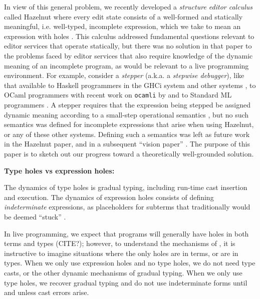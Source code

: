 In view of this general problem, we recently developed a \emph{structure editor calculus} called Hazelnut where every edit state consists of a well-formed and statically meaningful, i.e. well-typed, incomplete expression, which we take to mean an expression with holes \cite{popl-paper}. This calculus addressed fundamental questions relevant to editor services that operate statically, but there was no solution in that paper to the problems faced by editor services that also require knowledge of the dynamic meaning of an incomplete program, as would be relevant to a live programming environment. For example, consider a \emph{stepper} (a.k.a. a \emph{stepwise debugger}), like that available to Haskell programmers in the GHCi system \cite{GHC-stepper} and other systems \cite{DBLP:conf/haskell/MarlowIPG07,kar13566}, to OCaml programmers with recent work on \texttt{ocamli} by \citet{ocaml-stepper} and to Standard ML programmers \cite{DBLP:journals/jfp/TolmachA95}. A stepper requires that the expression being stepped be assigned dynamic meaning according to a small-step operational semantics \cite{DBLP:journals/jlp/Plotkin04a,pfpl}, but no such semantics was defined for incomplete expressions that arise when using Hazelnut, or any of these other systems. Defining such a semantics was left as future work in the Hazelnut paper, and in a subsequent ``vision paper'' \cite{snapl17-paper}. The purpose of this paper is to sketch out our progress toward a theoretically well-grounded solution.


\textbf{Type holes vs expression holes:}

The dynamics of type holes is gradual typing, including run-time cast
insertion and execution.
%
The dynamics of expression holes consists of defining
\emph{indeterminate} expressions, as placeholders for subterms that
traditionally would be deemed ``stuck'' .

In live programming, we expect that programs will generally have holes
in both terms and types (CITE?); however, to understand the mechanisms
of \HazelnutLive, it is instructive to imagine situations where the
only holes are in terms, or are in types.
%
When we only use expression holes and no type holes, we do not need
type casts, or the other dynamic mechanisms of gradual typing.
% 
When we only use type holes, we recover gradual typing and do not use
indeterminate forms until and unless cast errors arise.

